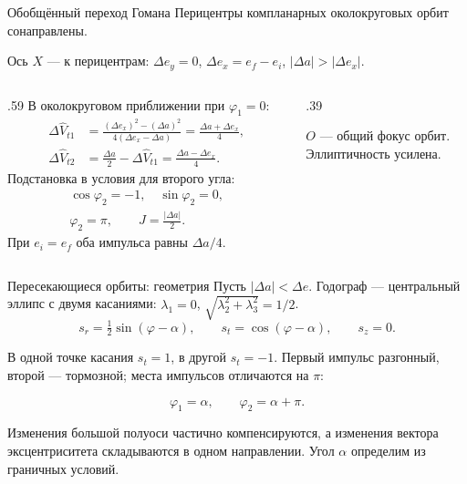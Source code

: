 \documentclass[11pt,aspectratio=169,t]{beamer}
\newcommand{\figcaption}[1]{{\usebeamerfont{caption}\color{coursemuted}#1\par}}
\newcommand{\derivationmathspacing}{%
  \setlength{\abovedisplayskip}{2pt}%
  \setlength{\belowdisplayskip}{3pt}%
  \setlength{\abovedisplayshortskip}{2pt}%
  \setlength{\belowdisplayshortskip}{2pt}%
  \setlength{\jot}{2pt}}
\begin{document}
\begin{frame}{Обобщённый переход Гомана}
\relax
\derivationmathspacing
Перицентры компланарных околокруговых орбит сонаправлены.\par
Ось $X$ --- к перицентрам: $\Delta e_y=0$, $\Delta e_x=e_f-e_i$,
$|\Delta a|>|\Delta e_x|$.
\begin{columns}[T,onlytextwidth]
\begin{column}{.59\textwidth}
\smallskip
В околокруговом приближении при $\varphi_1=0$:
\[
\begin{aligned}
 \Delta\widehat V_{t1}
   &=\frac{(\Delta e_x)^2-(\Delta a)^2}{4(\Delta e_x-\Delta a)}
     =\frac{\Delta a+\Delta e_x}{4},\\
 \Delta\widehat V_{t2}
   &=\frac{\Delta a}{2}-\Delta\widehat V_{t1}
     =\frac{\Delta a-\Delta e_x}{4}.
\end{aligned}
\]
Подстановка в условия для второго угла:
\[
\begin{gathered}
 \cos\varphi_2=-1,\quad \sin\varphi_2=0,\\
 \varphi_2=\pi,\qquad J=\frac{|\Delta a|}{2}.
\end{gathered}
\]
\smallskip
При $e_i=e_f$ оба импульса равны $\Delta a/4$.\par
\end{column}
\begin{column}{.39\textwidth}
\centering

\par
\figcaption{$O$ --- общий фокус орбит.\\Эллиптичность усилена.}
\end{column}
\end{columns}
\end{frame}


\begin{frame}{Пересекающиеся орбиты: геометрия}
\relax
\derivationmathspacing
Пусть $|\Delta a|<\Delta e$.
Годограф --- центральный эллипс с двумя касаниями:
$\lambda_1=0$, $\sqrt{\lambda_2^2+\lambda_3^2}=1/2$.
\[
 s_r=\tfrac12\sin(\varphi-\alpha),\qquad
 s_t=\cos(\varphi-\alpha),\qquad s_z=0.
\]
{\justifying
В одной точке касания $s_t=1$, в другой $s_t=-1$.
Первый импульс разгонный, второй --- тормозной;
места импульсов отличаются на $\pi$:
\par}
\[
 \varphi_1=\alpha,\qquad \varphi_2=\alpha+\pi.
\]
\medskip
{\justifying
Изменения большой полуоси частично компенсируются,
а изменения вектора эксцентриситета складываются в одном направлении.
Угол $\alpha$ определим из граничных условий.
\par}
\end{frame}
\end{document}
